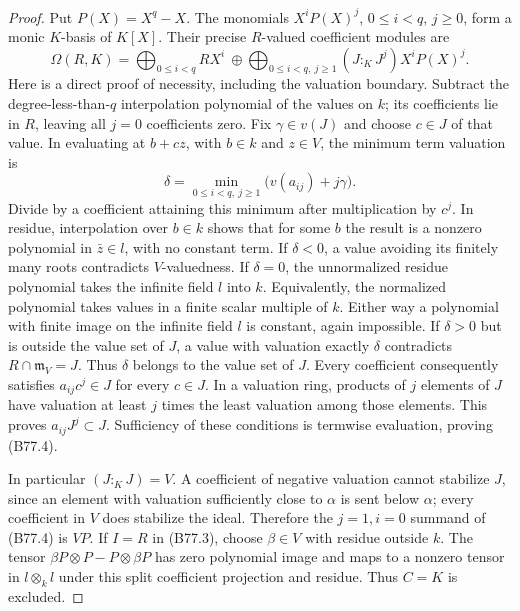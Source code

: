 \begin{proof}
Put $P(X)=X^q-X$. The monomials $X^iP(X)^j$, $0\le i<q$, $j\ge0$,
form a monic $K$-basis of $K[X]$.
Their precise $R$-valued coefficient modules are
\[
 \Omega(R,K)=\bigoplus_{0\le i<q}RX^i
 \ \oplus\!\bigoplus_{0\le i<q,\ j\ge1}
                          (J:_KJ^j)X^iP(X)^j.            \tag{B77.4}
\]
Here is a direct proof of necessity, including the valuation boundary.
Subtract the degree-less-than-$q$ interpolation polynomial of the
values on $k$; its coefficients lie in $R$, leaving all $j=0$
coefficients zero. Fix $\gamma\in v(J)$ and choose $c\in J$ of that
value. In evaluating at $b+cz$, with $b\in k$ and $z\in V$, the minimum
term valuation is
\[
                   \delta=\min_{0\le i<q,\ j\ge1}
                                 \bigl(v(a_{ij})+j\gamma\bigr).
\]
Divide by a coefficient attaining this minimum after multiplication
by $c^j$. In residue, interpolation over $b\in k$ shows that for some
$b$ the result is a nonzero polynomial in $\bar z\in l$, with no
constant term. If $\delta<0$, a value avoiding its finitely many roots
contradicts $V$-valuedness. If $\delta=0$, the unnormalized residue polynomial takes the
infinite field $l$ into $k$. Equivalently, the normalized polynomial
takes values in a finite scalar multiple of $k$. Either way a polynomial
with finite image on the infinite field $l$ is constant, again impossible. If $\delta>0$ but is outside the value set
of $J$, a value with valuation exactly $\delta$ contradicts
$R\cap\mathfrak m_V=J$. Thus $\delta$ belongs to the value set of $J$.
Every coefficient consequently satisfies $a_{ij}c^j\in J$ for every
$c\in J$. In a valuation ring, products of $j$ elements of $J$ have
valuation at least $j$ times the least valuation among those elements.
This proves $a_{ij}J^j\subset J$. Sufficiency of these conditions is
termwise evaluation, proving (B77.4).

In particular $(J:_KJ)=V$. A coefficient of negative valuation cannot
stabilize $J$, since an element with valuation sufficiently close to
$\alpha$ is sent below $\alpha$; every coefficient in $V$ does stabilize
the ideal. Therefore the $j=1,i=0$ summand of (B77.4) is $VP$.
If $I=R$ in (B77.3), choose $\beta\in V$ with residue outside $k$.
The tensor $\beta P\otimes P-P\otimes\beta P$ has zero polynomial
image and maps to a nonzero tensor in $l\otimes_k l$ under this split
coefficient projection and residue. Thus $C=K$ is excluded.


\end{proof}
